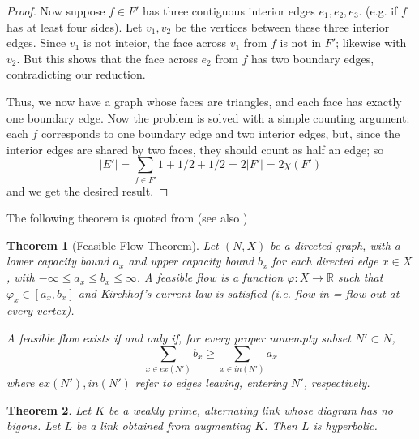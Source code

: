 \documentclass[11pt]{amsart}
\newcommand{\figref}[1]{Figure \ref{#1}}
\newcommand{\RR}{\mathbb{R}}
\newcommand{\vphi}{\varphi}
\theoremstyle{plain}
\newtheorem{theorem}{Theorem}[section]
\theoremstyle{definition}
\begin{document}
\begin{proof}
Now suppose $f\in F'$ has three contiguous interior edges
$e_1,e_2,e_3$.
(e.g. if $f$ has at least four sides).
Let $v_1, v_2$ be the vertices between these three interior edges.
Since $v_1$ is not inteior,
the face across $v_1$ from $f$ is not in $F'$;
likewise with $v_2$.
But this shows that the face across $e_2$ from $f$
has two boundary edges, contradicting our reduction.


Thus, we now have a graph whose faces are triangles,
and each face has exactly one boundary edge.
Now the problem is solved with a simple counting argument:
each $f$ corresponds to one boundary edge and two interior edges,
but, since the interior edges are shared by two faces,
they should count as half an edge; so
\[
 |E'| = \sum_{f\in F'} 1 + 1/2 + 1/2 = 2|F'| = 2\chi(F')
\]
and we get the desired result.
\end{proof}


The following theorem is quoted from \cite{BandS}
(see also \cite{FF})

\begin{theorem}[Feasible Flow Theorem]
\label{t:feasible_flow}
Let $(N,X)$ be a directed graph,
with a \emph{lower capacity bound} $a_x$
and \emph{upper capacity bound} $b_x$
for each directed edge $x \in X$,
with $-\infty \leq a_x \leq b_x \leq \infty$.
A \emph{feasible flow} is a function $\vphi : X \to \RR$
such that $\vphi_x \in [a_x, b_x]$ and
Kirchhof's current law is satisfied
(i.e. flow in = flow out at every vertex).

A feasible flow exists if and only if,
for every proper nonempty subset $N' \subset N$,
\[
\sum_{x \in ex(N')} b_x \geq \sum_{x \in in(N')} a_x
\]
where $ex(N'), in(N')$ refer to edges leaving,
entering $N'$, respectively.
\end{theorem}



\begin{theorem}
Let $K$ be a weakly prime, alternating link whose diagram has no bigons.
Let $L$ be a link obtained from augmenting $K$.
Then $L$ is hyperbolic.
\end{theorem}
\end{document}
